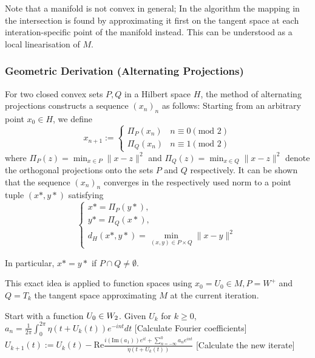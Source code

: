 Note that a manifold is not convex in general; In the algorithm \cite[§3]{Wegmann1989_alternating_projections} the mapping in the intersection is found by approximating it first on the tangent space at each interation-specific point of the manifold instead. This can be understood as a local linearisation of $M$.

\subsubsection{Geometric Derivation (Alternating Projections)}
For two closed convex sets $P,Q$ in a Hilbert space $H$, the method of alternating projections constructs a sequence $(x_n)_n$ as follows: Starting from an arbitrary point $x_0 \in H$, we define 
$$x_{n+1} := \begin{cases}
    \Pi_P (x_n) & n \equiv 0 (\text{mod } 2) \\
    \Pi_Q (x_n) & n \equiv 1 (\text{mod } 2)
\end{cases}$$ 
where $\Pi_P(z)=\min_{x\in P} \| x-z \|^2$ and $\Pi_Q(z)=\min_{x\in Q} \| x-z \|^2$ denote the orthogonal projections onto the sets $P$ and $Q$ respectively.
It can be shown that the sequence $(x_n)_n$ converges in the respectively used norm to a point tuple $(x*,y*)$ satisfying 
$$
\begin{cases}
    x*=\Pi_P(y*), \\
    y*=\Pi_Q(x*), \\
    d_H(x*,y*)= \min_{(x,y)\in P\times Q} \| x-y \|^2
\end{cases}
$$

In particular, $x*=y*$ if $P\cap Q \neq \emptyset$. 


This exact idea is applied to function spaces using $x_0=U_0 \in M, P=W^+$ and $Q =T_k$ the tangent space approximating $M$ at the current iteration.

\begin{algorithm}
    \caption{AP-Method}
    \begin{algorithmic}
    \STATE Start with a function $U_0\in W_{2}$.
    \STATE Given $U_k$ for $k\geq 0$,
            \STATE $a_n = \frac{1}{2\pi}\int_{0}^{2\pi} \eta(t+U_k(t))e^{-int} dt$ \hfill [Calculate Fourier coefficients]
        \ENDFOR
    \STATE $U_{k+1}(t) := U_k(t) - \text{Re}\frac{i (\text{Im}(a_1))e^{it}+\sum_{n=-\infty}^{0} a_n e^{int}}{\dot{\eta}(t+U_k(t))}$ \hfill [Calculate the new iterate]
    \end{algorithmic}
\end{algorithm}


